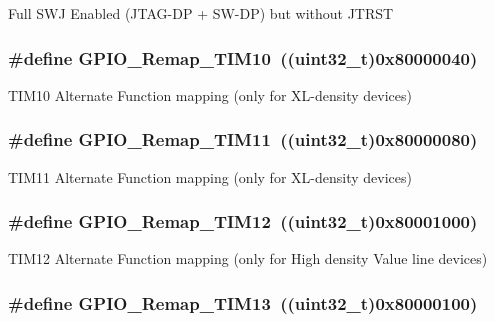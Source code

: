 \label{group__GPIO__Remap__define_ga81009ef35f7f039365291cf4f6fc0c5b}
Full SWJ Enabled (JTAG-\/DP + SW-\/DP) but without JTRST \hypertarget{group__GPIO__Remap__define_gac94252266a8fcb9ce7b55b5c55464110}{
\subsubsection[{GPIO\_\-Remap\_\-TIM10}]{\setlength{\rightskip}{0pt plus 5cm}\#define GPIO\_\-Remap\_\-TIM10~((uint32\_\-t)0x80000040)}}
\label{group__GPIO__Remap__define_gac94252266a8fcb9ce7b55b5c55464110}
TIM10 Alternate Function mapping (only for XL-\/density devices) \hypertarget{group__GPIO__Remap__define_ga0f308f1bb45e4c473766603b4bef47f8}{
\subsubsection[{GPIO\_\-Remap\_\-TIM11}]{\setlength{\rightskip}{0pt plus 5cm}\#define GPIO\_\-Remap\_\-TIM11~((uint32\_\-t)0x80000080)}}
\label{group__GPIO__Remap__define_ga0f308f1bb45e4c473766603b4bef47f8}
TIM11 Alternate Function mapping (only for XL-\/density devices) \hypertarget{group__GPIO__Remap__define_ga44d3d86a684f62f9142d34ea5975a637}{
\subsubsection[{GPIO\_\-Remap\_\-TIM12}]{\setlength{\rightskip}{0pt plus 5cm}\#define GPIO\_\-Remap\_\-TIM12~((uint32\_\-t)0x80001000)}}
\label{group__GPIO__Remap__define_ga44d3d86a684f62f9142d34ea5975a637}
TIM12 Alternate Function mapping (only for High density Value line devices) \hypertarget{group__GPIO__Remap__define_ga72f5da86ed94f3be978cd841f7cd37cb}{
\subsubsection[{GPIO\_\-Remap\_\-TIM13}]{\setlength{\rightskip}{0pt plus 5cm}\#define GPIO\_\-Remap\_\-TIM13~((uint32\_\-t)0x80000100)}}
